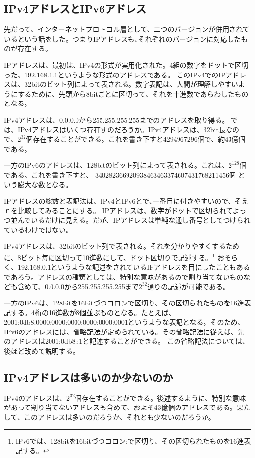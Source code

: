 \subsection{IPv4アドレスとIPv6アドレス}

先だって、インターネットプロトコル層として、二つのバージョンが併用されているという話をした。つまりIPアドレスも､それぞれのバージョンに対応したものが存在する。

IPアドレスは、最初は、IPv4の形式が実用化された。4組の数字をドットで区切った、192.168.1.1というような形式のアドレスである。
このIPv4でのIPアドレスは、32bitのビット列によって表される。数字表記は、人間が理解しやすいようにするために、先頭から8bitごとに区切って、それを十進数であらわしたものとなる。

IPv4アドレスは、0.0.0.0から255.255.255.255までのアドレスを取り得る。
では、IPv4アドレスはいくつ存在すのだろうか。IPv4アドレスは、32bit長なので、$2^{32}$個存在することができる。これを書き下すと4294967296個で、約43億個である。

一方のIPv6のアドレスは、128bitのビット列によって表される。これは、$2^{128}$個である。これを書き下すと、
340282366920938463463374607431768211456個
という膨大な数となる。

IPアドレスの総数と表記法は、IPv4とIPv6とで､一番目に付きやすいので、そえｒを比較してみることにする。
IPアドレスは、数字がドットで区切られてよっつ並んでいるだけに見える。だが、IPアドレスは単純な通し番号としてつけられているわけではない。

IPv4アドレスは、32bitのビット列で表される。それを分かりやすくするために、8ビット毎に区切って10進数にして、ドット区切りで記述する。\footnote{IPv6では、128bitを16bitづつコロン:で区切り、その区切られたものを16進表記する。} おそらく、192.168.0.1というような記述をされているIPアドレスを目にしたこともあるであろう。アドレスの種類としては、特別な意味があるので割り当てないものなども含めて、0.0.0.0から255.255.255.255まで$2^{32}$通りの記述が可能である。

一方のIPv6は、128bitを16bitづつコロンで区切り、その区切られたものを16進表記する。4桁の16進数が8個並ぶものとなる。たとえば、2001:0db8:0000:0000:0000:0000:0000:0001というような表記となる。そのため、IPv6のアドレスには、省略記法が定められている。その省略記法に従えば、先のアドレスは2001:0db8::1と記述することができる。
この省略記法については、後ほど改めて説明する。



\subsection{IPv4アドレスは多いのか少ないのか}
IPv4のアドレスは、$2^{32}$個存在することができる。後述するように、特別な意味があって割り当てないアドレスも含めて、およそ43億個のアドレスである。果たして、このアドレスは多いのだろうか、それとも少ないのだろうか。

